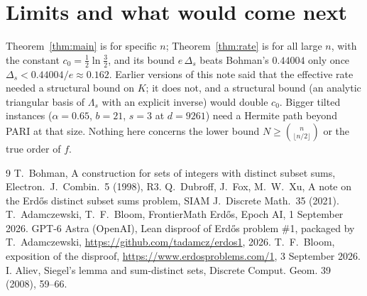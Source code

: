 \documentclass[11pt]{article}
\begin{document}
\section{Limits and what would come next}

Theorem~\ref{thm:main} is for specific $n$; Theorem~\ref{thm:rate} is for all large $n$, with the constant
$c_0=\frac12\ln\frac32$, and its bound $e\,\Delta_s$ beats Bohman's $0.44004$ only once $\Delta_s<0.44004/e\approx0.162$. Earlier versions of this note said that the effective rate needed a structural bound on $K$; it does
not, and a structural bound (an analytic triangular basis of $\Lambda_s$ with an explicit inverse) would double $c_0$. Bigger tilted instances ($\alpha=0.65$, $b=21$, $s=3$ at $d=9261$) need a Hermite
path beyond PARI at that size. Nothing here concerns the lower bound
$N\ge\binom{n}{\lfloor n/2\rfloor}$ or the true order of $f$.


\begin{thebibliography}{9}
 T.~Bohman, A construction for sets of integers with distinct subset sums, Electron.\ J.\ Combin.\ 5 (1998), R3.
 Q.~Dubroff, J.~Fox, M.~W.~Xu, A note on the Erd\H{o}s distinct subset sums problem, SIAM J.\ Discrete Math.\ 35 (2021).
 T.~Adamczewski, T.~F.~Bloom, FrontierMath Erd\H{o}s, Epoch AI, 1 September 2026.
 GPT-6 Astra (OpenAI), Lean disproof of Erd\H{o}s problem \#1, packaged by T.~Adamczewski, \url{https://github.com/tadamcz/erdos1}, 2026.
 T.~F.~Bloom, exposition of the disproof, \url{https://www.erdosproblems.com/1}, 3 September 2026.
 I. Aliev, Siegel's lemma and sum-distinct sets, Discrete Comput. Geom. 39 (2008), 59--66.
\end{thebibliography}
\end{document}
